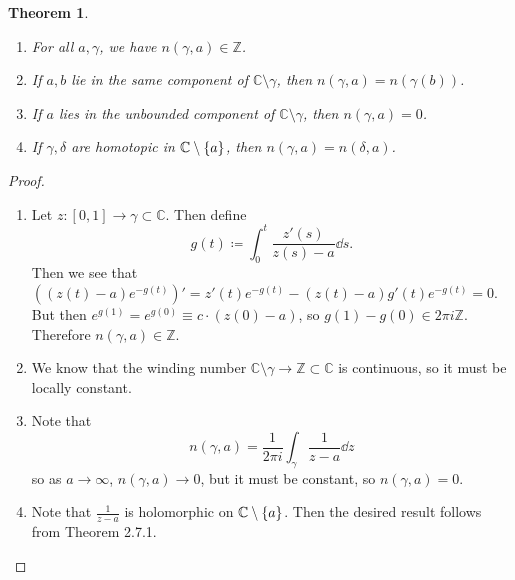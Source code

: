\documentclass[leqno, openany]{memoir}
\newtheorem{thm}{Theorem}[section]
\theoremstyle{definition}
\theoremstyle{remark}
\theoremstyle{plain}
\theoremstyle{definition}
\theoremstyle{remark}
\newcommand{\C}{\mathbb{C}}
\newcommand{\Z}{\mathbb{Z}}
\begin{document}
\begin{thm}\leavevmode
    \begin{enumerate}
        \item For all $a, \gamma$, we have $n(\gamma, a) \in \Z$.
        \item If $a, b$ lie in the same component of $\C \setminus \gamma$, then $n(\gamma, a) = n(\gamma(b))$.
        \item If $a$ lies in the unbounded component of $\C \setminus \gamma$, then $n(\gamma, a) = 0$.
        \item If $\gamma, \delta$ are homotopic in $\C \setminus \qty{a}$, then $n(\gamma, a) = n(\delta, a)$.
    \end{enumerate}
\end{thm}

\begin{proof}\leavevmode
    \begin{enumerate}
        \item Let $z \colon [0,1] \to \gamma \subset \C$. Then define
            \[ g(t) \coloneqq \int_0^t \frac{z'(s)}{z(s) - a} \dd{s}. \]
            Then we see that ${((z(t) - a)e^{-g(t)})}' = z'(t) e^{-g(t)} - (z(t)-a) g'(t) e^{-g(t)} = 0$. But then $e^{g(1)} = e^{g(0)} \equiv c \cdot (z(0)-a)$, so $g(1) - g(0) \in 2 \pi i \Z$. Therefore $n(\gamma, a) \in \Z$.
        \item We know that the winding number $\C \setminus \gamma \to \Z \subset \C$ is continuous, so it must be locally constant.
        \item Note that 
            \[ n(\gamma, a) = \frac{1}{2 \pi i} \int_{\gamma} \frac{1}{z-a} \dd{z} \]
            so as $a \to \infty$, $n(\gamma, a) \to 0$, but it must be constant, so $n(\gamma, a) = 0$.
        \item Note that $\frac{1}{z-a}$ is holomorphic on $\C \setminus \qty{a}$. Then the desired result follows from Theorem 2.7.1. \qedhere
    \end{enumerate}
\end{proof}
\end{document}
